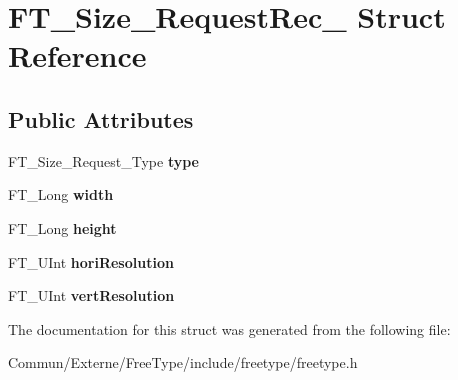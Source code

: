 \hypertarget{struct_f_t___size___request_rec__}{}\section{F\+T\+\_\+\+Size\+\_\+\+Request\+Rec\+\_\+ Struct Reference}
\label{struct_f_t___size___request_rec__}
\subsection*{Public Attributes}
\begin{DoxyCompactItemize}
\item 
F\+T\+\_\+\+Size\+\_\+\+Request\+\_\+\+Type {\bfseries type}\hypertarget{struct_f_t___size___request_rec___a7644b04dd2b26c0698df558775320494}{}\label{struct_f_t___size___request_rec___a7644b04dd2b26c0698df558775320494}

\item 
F\+T\+\_\+\+Long {\bfseries width}\hypertarget{struct_f_t___size___request_rec___a7b044d36af318b053d5e3939eb0d5039}{}\label{struct_f_t___size___request_rec___a7b044d36af318b053d5e3939eb0d5039}

\item 
F\+T\+\_\+\+Long {\bfseries height}\hypertarget{struct_f_t___size___request_rec___af8142450d8d032e1870d758cdcfa51a9}{}\label{struct_f_t___size___request_rec___af8142450d8d032e1870d758cdcfa51a9}

\item 
F\+T\+\_\+\+U\+Int {\bfseries hori\+Resolution}\hypertarget{struct_f_t___size___request_rec___a3a85704d13561d9db53aa60f7805ec73}{}\label{struct_f_t___size___request_rec___a3a85704d13561d9db53aa60f7805ec73}

\item 
F\+T\+\_\+\+U\+Int {\bfseries vert\+Resolution}\hypertarget{struct_f_t___size___request_rec___a86601c38d91064b6efe256a9e99c56f4}{}\label{struct_f_t___size___request_rec___a86601c38d91064b6efe256a9e99c56f4}

\end{DoxyCompactItemize}


The documentation for this struct was generated from the following file\+:\begin{DoxyCompactItemize}
\item 
Commun/\+Externe/\+Free\+Type/include/freetype/freetype.\+h\end{DoxyCompactItemize}
